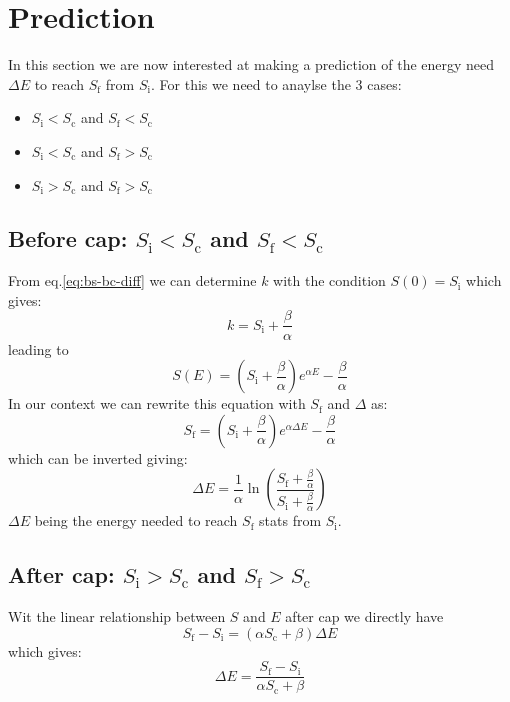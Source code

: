 \documentclass[12pt]{article}
\def\Sc{S_\text{c}}
\def\Si{S_\text{i}}
\def\Sf{S_\text{f}}
\begin{document}
\section{Prediction}
In this section we are now interested at making a prediction of the energy need $\Delta E$ to reach $\Sf$ from $\Si$. For this we need to anaylse the 3 cases:
\begin{itemize}
    \item $\Si < \Sc$ and $\Sf < \Sc$
    \item $\Si < \Sc$ and $\Sf > \Sc$
    \item $\Si > \Sc$ and $\Sf > \Sc$
\end{itemize}
\subsection{Before cap: $\Si < \Sc$ and $\Sf < \Sc$}
From eq.\eqref{eq:bs-bc-diff} we can determine $k$ with the condition $S(0) = \Si$ which gives:
\begin{equation}
    k = \Si + \frac{\beta}{\alpha}
\end{equation}
leading to
\begin{equation}
    S(E) = \left(\Si + \frac{\beta}{\alpha}\right)e^{\alpha E} - \frac{\beta}{\alpha}
\end{equation}
In our context we can rewrite this equation with $\Sf$ and $\Delta$ as:
\begin{equation}
    \Sf = \left(\Si + \frac{\beta}{\alpha}\right)e^{\alpha \Delta E} - \frac{\beta}{\alpha}
\end{equation}
which can be inverted giving:
\begin{equation}
    \Delta E = \frac{1}{\alpha} \ln\left( \frac{\Sf + \frac{\beta}{\alpha}}{\Si + \frac{\beta}{\alpha}} \right)
\end{equation}
$\Delta E$ being the energy needed to reach $\Sf$ stats from $\Si$.

\subsection{After cap: $\Si > \Sc$ and $\Sf > \Sc$}
Wit the linear relationship between $S$ and $E$ after cap we directly have
\begin{equation}
    \Sf - \Si = (\alpha \Sc + \beta) \Delta E
\end{equation}
which gives:
\begin{equation}
    \Delta E = \frac{\Sf - \Si}{\alpha \Sc + \beta}
\end{equation}
\end{document}

